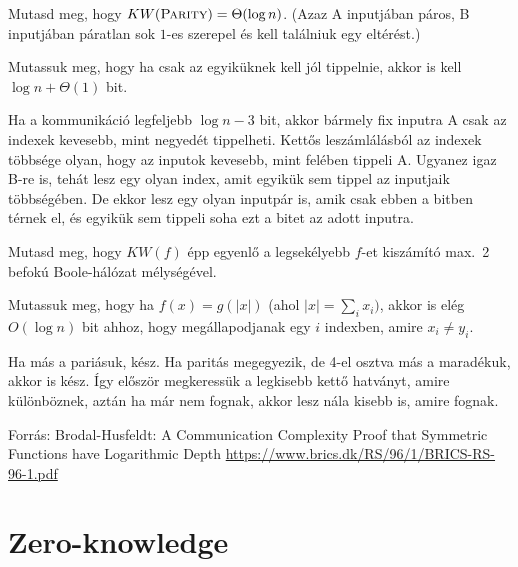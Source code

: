 \begin{Exercise}[counter={sorszam}, difficulty=0]
	Mutasd meg, hogy $KW(\mbox{\sc{Parity}})=\Theta(\log n)$. (Azaz A inputjában páros, B inputjában páratlan sok $1$-es szerepel és kell találniuk egy eltérést.)
\end{Exercise}

\begin{Exercise}[counter={sorszam}, difficulty=1]
	Mutassuk meg, hogy ha csak az egyik\"uknek kell j\'ol tippelnie, akkor is kell $\log n+\Theta(1)$ bit. 
\end{Exercise}
\begin{Answer}
	Ha a kommunik\'aci\'o legfeljebb $\log n-3$ bit, akkor b\'armely fix inputra A csak az indexek kevesebb, mint negyed\'et tippelheti.
	Kett\H os lesz\'aml\'al\'asb\'ol az indexek t\"obbs\'ege olyan, hogy az inputok kevesebb, mint fel\'eben tippeli A.
	Ugyanez igaz B-re is, teh\'at lesz egy olyan index, amit egyik\"uk sem tippel az inputjaik t\"obbs\'eg\'eben.
	De ekkor lesz egy olyan inputp\'ar is, amik csak ebben a bitben t\'ernek el, \'es egyik\"uk sem tippeli soha ezt a bitet az adott inputra.
\end{Answer}	

\begin{Exercise}[counter={sorszam}, difficulty=1]
	Mutasd meg, hogy $KW(f)$ \'epp egyenl\H o a legsek\'elyebb $f$-et kisz\'am\'it\'o max.\ 2 befok\'u Boole-h\'al\'ozat m\'elys\'eg\'evel.
\end{Exercise}%

\begin{Exercise}[counter={sorszam}, difficulty=1]\label{kwsym}
	Mutassuk meg, hogy ha $f(x)=g(|x|)$ (ahol $|x|=\sum_i x_i)$, akkor is el\'eg $O(\log n)$ bit ahhoz, hogy megállapodjanak egy $i$ indexben, amire $x_i\neq y_i$. 
\end{Exercise}
\begin{Answer}
	Ha m\'as a pari\'asuk, k\'esz. Ha parit\'as megegyezik, de 4-el osztva m\'as a marad\'ekuk, akkor is k\'esz. \'Igy el\H osz\"or megkeress\"uk a legkisebb kett\H o hatv\'anyt, amire k\"ul\"onb\"oznek, azt\'an ha m\'ar nem fognak, akkor lesz n\'ala kisebb is, amire fognak.

	Forr\'as: Brodal-Husfeldt: A Communication Complexity Proof that Symmetric Functions have Logarithmic Depth \url{https://www.brics.dk/RS/96/1/BRICS-RS-96-1.pdf}
\end{Answer}

\section{Zero-knowledge}

